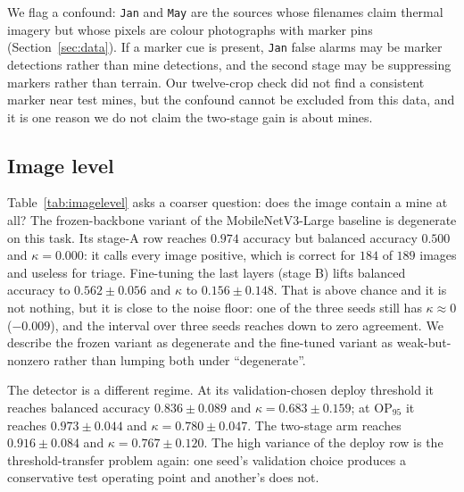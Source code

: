 We flag a confound: \texttt{Jan} and \texttt{May} are the sources whose filenames
claim thermal imagery but whose pixels are colour photographs with marker pins
(Section~\ref{sec:data}). If a marker cue is present, \texttt{Jan} false alarms
may be marker detections rather than mine detections, and the second stage may be
suppressing markers rather than terrain. Our twelve-crop check did not find a
consistent marker near test mines, but the confound cannot be excluded from this
data, and it is one reason we do not claim the two-stage gain is about mines.

\subsection{Image level}
\label{sec:imagelevel}

Table~\ref{tab:imagelevel} asks a coarser question: does the image contain a mine
at all? The frozen-backbone variant of the MobileNetV3-Large baseline is
degenerate on this task. Its stage-A row reaches $0.974$ accuracy but balanced
accuracy $0.500$ and $\kappa = 0.000$: it calls every image positive, which is
correct for $184$ of $189$ images and useless for triage. Fine-tuning the last
layers (stage B) lifts balanced accuracy to $0.562 \pm 0.056$ and $\kappa$ to
$0.156 \pm 0.148$. That is above chance and it is not nothing, but it is close
to the noise floor: one of the three seeds still has $\kappa \approx 0$ ($-0.009$),
and the interval over three seeds reaches down to zero agreement. We describe the
frozen variant as degenerate and the fine-tuned variant as weak-but-nonzero
rather than lumping both under ``degenerate''.

The detector is a different regime. At its validation-chosen deploy threshold it
reaches balanced accuracy $0.836 \pm 0.089$ and $\kappa = 0.683 \pm 0.159$; at
$\mathrm{OP}_{95}$ it reaches $0.973 \pm 0.044$ and $\kappa = 0.780 \pm 0.047$.
The two-stage arm reaches $0.916 \pm 0.084$ and $\kappa = 0.767 \pm 0.120$. The
high variance of the deploy row is the threshold-transfer problem again: one
seed's validation choice produces a conservative test operating point and
another's does not.


